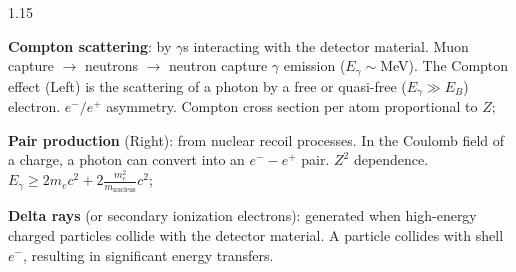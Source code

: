 \documentclass{beamer}
\begin{document}
\begin{frame}
    \begin{columns}
        \begin{column}{1.15\framewidth}
            \begin{itemize}
               {\small \item \textbf{Compton scattering}: by $\gamma$s interacting with the detector material. 
               Muon capture $\rightarrow$ neutrons $\rightarrow$ neutron capture $\gamma$ emission ($E_\gamma \sim$MeV). 
               The Compton effect (Left) is the scattering of a photon by a free or quasi-free ($E_\gamma \gg E_B$)
               electron. $e^-/ e^+$ asymmetry. Compton cross section per atom proportional to $Z$;  
               \item \textbf{Pair production} (Right): from nuclear recoil processes. In the Coulomb 
               field of a charge, a photon can convert into an $e^- - e^+$ pair. $Z^2$ dependence.  
               $E_{\gamma} \geq 2m_e c^2 + 2 \frac{m_e^2}{m_{\text{nucleus}}} c^2$;
              
               \item \textbf{Delta rays} (or secondary ionization electrons): generated
               when high-energy charged particles collide with the detector material. 
               A particle collides with shell $e^-$, 
               resulting in significant energy transfers. 
                }
            \end{itemize}
        \end{column}
        \end{columns}
\end{frame}
\end{document}
